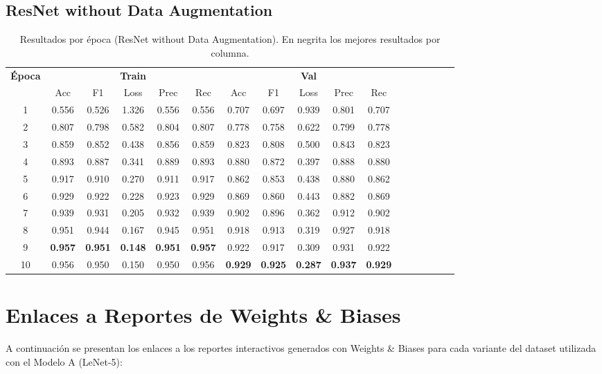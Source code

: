 \documentclass[conference]{IEEEtran}
\begin{document}
\subsection{ResNet without Data Augmentation}
\begin{table}[h]
\scriptsize
\caption{Resultados por época (ResNet without Data Augmentation). En negrita los mejores resultados por columna.}
\centering
\begin{tabular}{|c|c|c|c|c|c|c|c|c|c|c|c|c|c|c|c|c|}
\hline
\textbf{Época} & \multicolumn{5}{c|}{\textbf{Train}} & \multicolumn{5}{c|}{\textbf{Val}} \\
\cline{2-11}
 & Acc & F1 & Loss & Prec & Rec & Acc & F1 & Loss & Prec & Rec \\
\hline
1 & 0.556 & 0.526 & 1.326 & 0.556 & 0.556 & 0.707 & 0.697 & 0.939 & 0.801 & 0.707 \\
2 & 0.807 & 0.798 & 0.582 & 0.804 & 0.807 & 0.778 & 0.758 & 0.622 & 0.799 & 0.778 \\
3 & 0.859 & 0.852 & 0.438 & 0.856 & 0.859 & 0.823 & 0.808 & 0.500 & 0.843 & 0.823 \\
4 & 0.893 & 0.887 & 0.341 & 0.889 & 0.893 & 0.880 & 0.872 & 0.397 & 0.888 & 0.880 \\
5 & 0.917 & 0.910 & 0.270 & 0.911 & 0.917 & 0.862 & 0.853 & 0.438 & 0.880 & 0.862 \\
6 & 0.929 & 0.922 & 0.228 & 0.923 & 0.929 & 0.869 & 0.860 & 0.443 & 0.882 & 0.869 \\
7 & 0.939 & 0.931 & 0.205 & 0.932 & 0.939 & 0.902 & 0.896 & 0.362 & 0.912 & 0.902 \\
8 & 0.951 & 0.944 & 0.167 & 0.945 & 0.951 & 0.918 & 0.913 & 0.319 & 0.927 & 0.918 \\
9 & \textbf{0.957} & \textbf{0.951} & \textbf{0.148} & \textbf{0.951} & \textbf{0.957} & 0.922 & 0.917 & 0.309 & 0.931 & 0.922 \\
10 & 0.956 & 0.950 & 0.150 & 0.950 & 0.956 & \textbf{0.929} & \textbf{0.925} & \textbf{0.287} & \textbf{0.937} & \textbf{0.929} \\
\hline
\end{tabular}
\label{tab:resnet_noaug}
\end{table}


\section{Enlaces a Reportes de Weights \& Biases}
\label{appendix:wandb}

A continuación se presentan los enlaces a los reportes interactivos generados con Weights \& Biases para cada variante del dataset utilizada con el Modelo A (LeNet-5):
\end{document}
